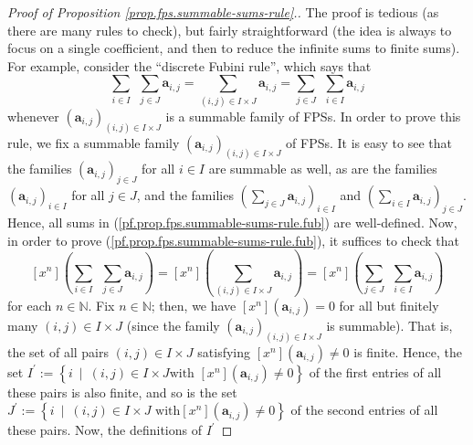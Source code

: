 \begin{proof}
[Proof of Proposition \ref{prop.fps.summable-sums-rule}.]The proof is tedious
(as there are many rules to check), but fairly straightforward (the idea is
always to focus on a single coefficient, and then to reduce the infinite sums
to finite sums). For example, consider the \textquotedblleft discrete Fubini
rule\textquotedblright, which says that%
\begin{equation}
\sum_{i\in I}\ \ \sum_{j\in J}\mathbf{a}_{i,j}=\sum_{\left(  i,j\right)  \in
I\times J}\mathbf{a}_{i,j}=\sum_{j\in J}\ \ \sum_{i\in I}\mathbf{a}_{i,j}
\label{pf.prop.fps.summable-sums-rule.fub}%
\end{equation}
whenever $\left(  \mathbf{a}_{i,j}\right)  _{\left(  i,j\right)  \in I\times
J}$ is a summable family of FPSs. In order to prove this rule, we fix a
summable family $\left(  \mathbf{a}_{i,j}\right)  _{\left(  i,j\right)  \in
I\times J}$ of FPSs. It is easy to see that the families $\left(
\mathbf{a}_{i,j}\right)  _{j\in J}$ for all $i\in I$ are summable as well, as
are the families $\left(  \mathbf{a}_{i,j}\right)  _{i\in I}$ for all $j\in
J$, and the families $\left(  \sum_{j\in J}\mathbf{a}_{i,j}\right)  _{i\in I}$
and $\left(  \sum_{i\in I}\mathbf{a}_{i,j}\right)  _{j\in J}$. Hence, all sums
in (\ref{pf.prop.fps.summable-sums-rule.fub}) are well-defined. Now, in order
to prove (\ref{pf.prop.fps.summable-sums-rule.fub}), it suffices to check that%
\[
\left[  x^{n}\right]  \left(  \sum_{i\in I}\ \ \sum_{j\in J}\mathbf{a}%
_{i,j}\right)  =\left[  x^{n}\right]  \left(  \sum_{\left(  i,j\right)  \in
I\times J}\mathbf{a}_{i,j}\right)  =\left[  x^{n}\right]  \left(  \sum_{j\in
J}\ \ \sum_{i\in I}\mathbf{a}_{i,j}\right)
\]
for each $n\in\mathbb{N}$. Fix $n\in\mathbb{N}$; then, we have $\left[
x^{n}\right]  \left(  \mathbf{a}_{i,j}\right)  =0$ for all but finitely many
$\left(  i,j\right)  \in I\times J$ (since the family $\left(  \mathbf{a}%
_{i,j}\right)  _{\left(  i,j\right)  \in I\times J}$ is summable). That is,
the set of all pairs $\left(  i,j\right)  \in I\times J$ satisfying $\left[
x^{n}\right]  \left(  \mathbf{a}_{i,j}\right)  \neq0$ is finite. Hence, the
set $I^{\prime}:=\left\{  i\ \mid\ \left(  i,j\right)  \in I\times J\text{
with }\left[  x^{n}\right]  \left(  \mathbf{a}_{i,j}\right)  \neq0\right\}  $
of the first entries of all these pairs is also finite, and so is the set
$J^{\prime}:=\left\{  i\ \mid\ \left(  i,j\right)  \in I\times J\text{ with
}\left[  x^{n}\right]  \left(  \mathbf{a}_{i,j}\right)  \neq0\right\}  $ of
the second entries of all these pairs. Now, the definitions of $I^{\prime}$

\end{proof}
